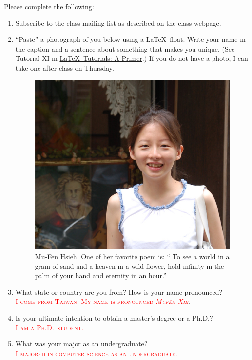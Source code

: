 \documentclass[12pt]{article}
\newcommand{\fillin}[1]{\textcolor{red}{\textsc{#1}}}
\begin{document}
Please complete the following:
\begin{enumerate}
\item Subscribe to the class mailing list as described on the class webpage.
\item ``Paste'' a photograph of you below using a \LaTeX\ float.  Write your name in the caption and a sentence about something that makes you unique.  (See Tutorial XI in \href{http://www.stat.tamu.edu/~dahl/teaching/604/lecture/l02/ltxprimer.pdf}{\LaTeX\ Tutorials: A Primer}.)  If you do not have a photo, I can take one after class on Thursday.\\
\begin{figure}[h]
\centering
\includegraphics{mufen.jpg}
\caption{Mu-Fen Hsieh. One of her favorite poem is: ``
To see a world in a grain of sand 
and a heaven in a wild flower,
hold infinity in the palm of your hand
and eternity in an hour.''}
\end{figure}
\item What state or country are you from?  How is your name pronounced?\\
\fillin{I come from Taiwan. My name is pronounced \emph{M\`{u}f\={e}n X\`{i}e}}.
\item Is your ultimate intention to obtain a master's degree or a Ph.D.?\\
\fillin{I am a Ph.D.\ student.}
\item What was your major as an undergraduate?\\
\fillin{I majored in computer science as an undergraduate.}

\end{enumerate}
\end{document}
